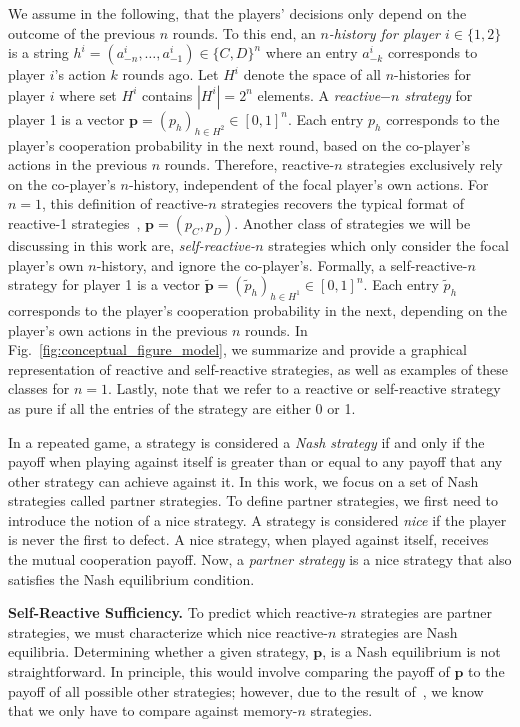 \documentclass[11pt]{article}
\begin{document}
We assume in the following, that the players' decisions only depend on the
outcome of the previous $n$ rounds. To this end, an {\it $n$-history for player
$i \in \{1, 2\}$} is a string $h^i=(a^i_{-n},\ldots,a^i_{-1})\!\in\!\{C,D\}^n$
where an entry $a^i_{-k}$ corresponds to player $i$'s action $k$ rounds ago. Let
$H^i$ denote the space of all $n$-histories for player $i$ where set $H^i$
contains $|H^i|=2^{n}$ elements. A {\it reactive$-n$ strategy} for player 1 is a
vector $\mathbf{p}=(p_h)_{h\in H^2} \in [0, 1]^{n}$. Each entry $p_h$
corresponds to the player's cooperation probability in the next round, based on
the co-player's actions in the previous $n$ rounds. Therefore, reactive-$n$
strategies exclusively rely on the co-player's $n$-history, independent of the
focal player's own actions. For \(n=1\), this definition of reactive-\(n\)
strategies recovers the typical format of reactive-1
strategies~\cite{baek:scientific:2016, wahl:JTB:1999, mcavoy:PRSA:2019},
\(\mathbf{p}=(p_C, p_D)\). Another class of strategies we will be discussing in
this work are, {\it self-reactive-$n$} strategies which only consider the focal
player's own $n$-history, and ignore the co-player's. Formally, a
self-reactive-$n$ strategy for player 1 is a vector $\mathbf{\tilde{p}} =
(\tilde{p}_h)_{h \in H^1} \in [0, 1] ^ {n}$. Each entry $\tilde{p}_h$
corresponds to the player's cooperation probability in the next, depending on
the player's own actions in the previous $n$ rounds.
In Fig.~\ref{fig:conceptual_figure_model}, we summarize and provide a graphical
representation of reactive and self-reactive strategies, as well as examples of
these classes for $n=1$. Lastly, note that we refer to a reactive or
self-reactive strategy as pure if all the entries of the strategy are either 0
or 1.

In a repeated game, a strategy is considered a {\it Nash strategy} if and only if the
payoff when playing against itself is greater than or equal to any payoff that
any other strategy can achieve against it. In this work, we focus on a set of
Nash strategies called partner strategies. To define partner strategies, we
first need to introduce the notion of a nice strategy. A strategy is considered
{\it nice} if the player is never the first to defect. A nice strategy, when played
against itself, receives the mutual cooperation payoff. Now, a {\it partner strategy}
is a nice strategy that also satisfies the Nash equilibrium condition.


\textbf{Self-Reactive Sufficiency.} To predict which reactive-$n$ strategies are
partner strategies, we must characterize which nice reactive-$n$ strategies are
Nash equilibria. Determining whether a given strategy, $\mathbf{p}$, is a Nash
equilibrium is not straightforward. In principle, this would involve comparing
the payoff of $\mathbf{p}$ to the payoff of all possible other strategies;
however, due to the result of~\cite{press:PNAS:2012}, we know that we only have
to compare against memory-$n$ strategies.
\end{document}
